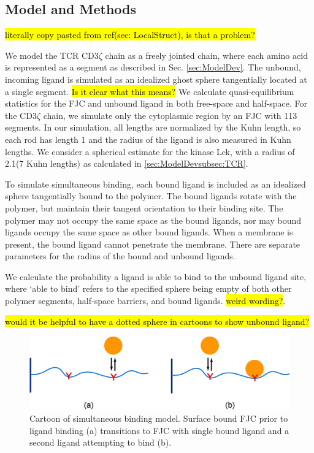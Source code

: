 \documentclass[../../AdvancementSummary.tex]{subfiles}
\begin{document}
\subsection{Model and Methods}

\hl{literally copy pasted from ref(sec: LocalStruct), is that a problem?}

We model the TCR CD3$\zeta$ chain as a freely jointed chain, where each amino acid is represented as a segment as described in Sec. \ref{sec:ModelDev}. The unbound, incoming ligand is simulated as an idealized ghost sphere tangentially located at a single segment. \hl{Is it clear what this means?} We calculate quasi-equilibrium statistics for the FJC and unbound ligand in both free-space and half-space. For the CD3$\zeta$ chain, we simulate only the cytoplasmic region by an FJC with 113 segments. In our simulation, all lengths are normalized by the Kuhn length, so each rod has length 1 and the radius of the ligand is also measured in Kuhn lengths. We consider a spherical estimate for the kinase Lck, with a radius of 2.1\nm (7 Kuhn lengths) as calculated in \ref{sec:ModelDevsubsec:TCR}.

To simulate simultaneous binding, each bound ligand is included as an idealized sphere tangentially bound to the polymer.  The bound ligands rotate with the polymer, but maintain their tangent orientation to their binding site. The polymer may not occupy the same space as the bound ligands, nor may bound ligands occupy the same space as other bound ligands. When a membrane is present, the bound ligand cannot penetrate the membrane. There are separate parameters for the radius of the bound and unbound ligands. 

We calculate the probability a ligand is able to bind to the unbound ligand site, where `able to bind' refers to the specified sphere being empty of both other polymer segments, half-space barriers, and bound ligands. \hl{weird wording?}. 

\hl{would it be helpful to have a dotted sphere in cartoons to show unbound ligand?}

\begin{figure}[H]
\begin{center}
    \includegraphics[width=0.8\linewidth]{ResultsFigures/SimultaneousBindingDiagram/SimultaneousBindingDiagram.eps}
    \caption{Cartoon of simultaneous binding model. Surface bound FJC prior to ligand binding (a) transitions to FJC with single bound ligand and a second ligand attempting to bind (b). \label{fig: SimBindCartoon}}
    \end{center}
\end{figure}
\end{document}
